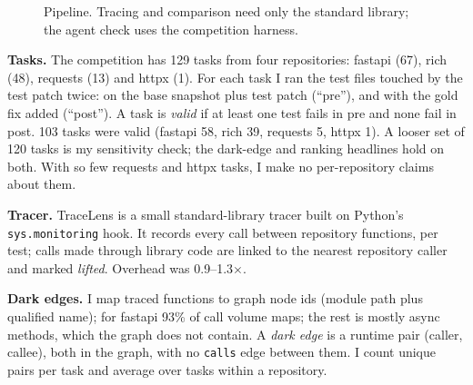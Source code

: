 \documentclass[11pt]{article}
\begin{document}
\begin{figure}[t]
\centering
{}
\caption{Pipeline. Tracing and comparison need only the standard library; the agent check uses the competition harness.}
\label{fig:pipeline}
\end{figure}

\textbf{Tasks.} The competition has 129 tasks from four repositories: fastapi (67), rich (48), requests (13) and httpx (1). For each task I ran the test files touched by the test patch twice: on the base snapshot plus test patch (``pre''), and with the gold fix added (``post''). A task is \emph{valid} if at least one test fails in pre and none fail in post. 103 tasks were valid (fastapi 58, rich 39, requests 5, httpx 1). A looser set of 120 tasks is my sensitivity check; the dark-edge and ranking headlines hold on both. With so few requests and httpx tasks, I make no per-repository claims about them.

\textbf{Tracer.} TraceLens is a small standard-library tracer built on Python's \texttt{sys.monitoring} hook. It records every call between repository functions, per test; calls made through library code are linked to the nearest repository caller and marked \emph{lifted}. Overhead was 0.9--1.3$\times$.

\textbf{Dark edges.} I map traced functions to graph node ids (module path plus qualified name); for fastapi 93\% of call volume maps; the rest is mostly async methods, which the graph does not contain. A \emph{dark edge} is a runtime pair (caller, callee), both in the graph, with no \texttt{calls} edge between them. I count unique pairs per task and average over tasks within a repository.
\end{document}
